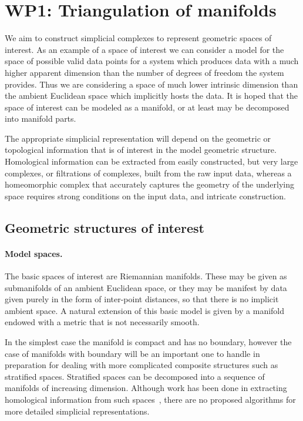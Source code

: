 %

\newcommand{\man}{\mathcal{M}}
\newcommand{\reel}{\mathbb{R}}
\newcommand{\rdee}{\reel^d}
\renewcommand{\pts}{P}
\newcommand{\mesh}{\hat{M}}

\newcommand{\ramsay}[1]{\rred{[[#1]]}}

\section*{WP1: Triangulation of manifolds}

We aim to construct simplicial complexes to represent
geometric spaces of interest. As an example of a space of interest we
can consider a model for the space of possible valid data points for a
system which produces data with a much higher apparent dimension than
the number of degrees of freedom  the system provides. Thus we are
considering a space of much lower intrinsic dimension than the ambient
Euclidean space which implicitly hosts the data. It is hoped that the
space of interest can be modeled as a manifold, or at least may be
decomposed into manifold parts. 

The appropriate simplicial representation will depend on the geometric
or topological information that is of interest in the model geometric
structure. Homological information can be extracted from easily
constructed, but very large complexes, or filtrations of complexes,
built from the raw input data, whereas a homeomorphic complex that
accurately captures the geometry of the underlying space requires
strong conditions on the input data, and intricate construction.


\subsection*{Geometric structures of interest}

\paragraph{Model spaces.} 
The basic spaces of interest are Riemannian manifolds. These may be
given as submanifolds of an ambient Euclidean space, or they may be
manifest by data given purely in the form of inter-point distances, so
that there is no implicit ambient space.  
A natural extension of this basic model is given by a manifold endowed
with a metric that is not necessarily smooth. 

In the simplest case the manifold is compact and has no boundary,
however the case of manifolds with boundary will be an important one
to handle in preparation for dealing with more complicated composite
structures such as stratified spaces. Stratified spaces can be
decomposed into a sequence of manifolds of increasing
dimension. Although work has been done in extracting homological
information from such spaces~\cite{bendich2007,bendich2010}, there are
no proposed algorithms for more detailed simplicial representations.

